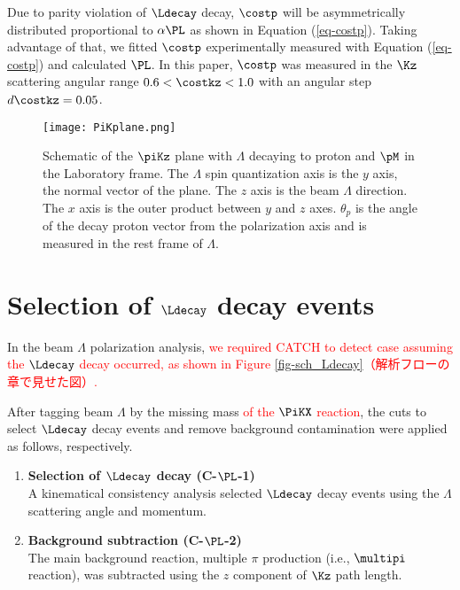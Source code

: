Due to parity violation of $\Ldecay$ decay, $\costp$ will be asymmetrically distributed proportional to $\alpha\PL$ \cite{Lee1957} as shown in Equation (\ref{eq-costp}). Taking advantage of that, we fitted $\costp$ experimentally measured with Equation (\ref{eq-costp}) and calculated $\PL$. In this paper, $\costp$ was measured in the $\Kz$ scattering angular range $0.6<\costkz<1.0$ with an angular step $d\costkz = 0.05$.


\begin{figure}[h]
  \centering
  \texttt{[image: PiKplane.png]}
  \caption{Schematic of the $\piKz$ plane with $\Lambda$ decaying to proton and $\pM$ in the Laboratory frame. The $\Lambda$ spin quantization axis is the $y$ axis, the normal vector of the plane. The $z$ axis is the beam $\Lambda$ direction. The $x$ axis is the outer product between $y$ and $z$ axes. $\theta_p$ is the angle of the decay proton vector from the polarization axis and is measured in the rest frame of $\Lambda$.}
  \label{fig-PiKplane}
\end{figure}


\clearpage
\section{Selection of $\Ldecay$ decay events}
\label{sec-Pl-evsele}

In the beam $\Lambda$ polarization analysis, \textcolor{red}{ we required CATCH to detect case  assuming the $\Ldecay$ decay occurred, as shown in Figure \ref{fig-sch_Ldecay}（解析フローの章で見せた図）. } %

After tagging beam $\Lambda$ by the missing mass \textcolor{red}{of the $\PiKX$ reaction}, the cuts to select $\Ldecay$ decay events and remove background contamination were applied as follows, respectively. 


\begin{enumerate}
  \item {\bf Selection of $\Ldecay$ decay ({\bf C-$\PL$-1}) } \\
  A kinematical consistency analysis selected $\Ldecay$ decay events using the $\Lambda$ scattering angle and momentum.
  \item {\bf Background subtraction ({\bf C-$\PL$-2}) } \\
  The main background reaction, multiple $\pi$ production (i.e., $\multipi$ reaction), was subtracted using the $z$ component of $\Kz$ path length. 
\end{enumerate}


